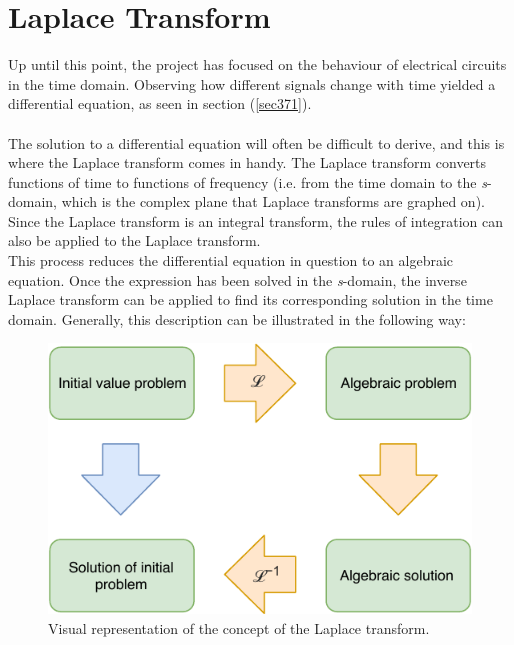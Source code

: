 \chapter{Laplace Transform}
Up until this point, the project has focused on the behaviour of electrical circuits in the time domain. Observing how different signals change with time yielded a differential equation, as seen in section (\ref{sec371}).
\\ \\
The solution to a differential equation will often be difficult to derive, and this is where the Laplace transform comes in handy. The Laplace transform converts functions of time to functions of frequency (i.e. from the time domain to the \textit{s}-domain, which is the complex plane that Laplace transforms are graphed on). Since the Laplace transform is an integral transform, the rules of integration can also be applied to the Laplace transform.
\\
\noindent This process reduces the differential equation in question to an algebraic equation. Once the expression has been solved in the \textit{s}-domain, the inverse Laplace transform can be applied to find its corresponding solution in the time domain. Generally, this description can be illustrated in the following way:
\begin{figure}[H]
\center
\includegraphics[scale=1]{fig/img/laplace_circ.pdf}
\caption{Visual representation of the concept of the Laplace transform.}
\label{lpsol}
\end{figure}

